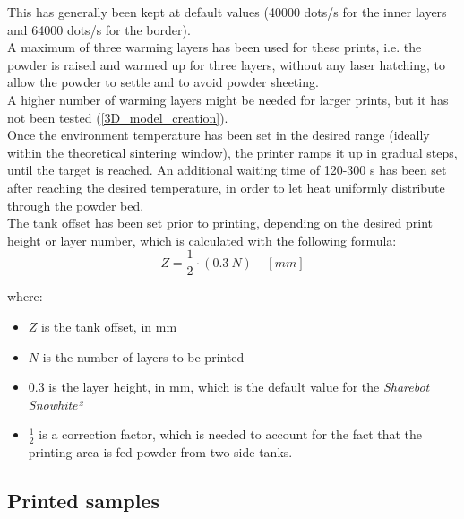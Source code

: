 \documentclass{article}
\begin{document}
        This has generally been kept at default values (40000 dots/s for the inner layers and 64000 dots/s for the border).  \\ 

        A maximum of three warming layers has been used for these prints, i.e. the powder is raised and warmed 
        up for three layers, without any laser hatching, to allow the powder to settle and to avoid 
        powder sheeting. \\ 
        A higher number of warming layers might be needed for larger prints, but it has not been tested 
        (\ref{3D_model_creation}). \\

        Once the environment temperature has been set in the desired range (ideally within the theoretical 
        sintering window), the printer ramps it up in gradual steps, until the target is reached.  
        An additional waiting time of 120-300 s has been set after reaching the desired temperature, in order to let heat 
        uniformly distribute through the powder bed. \\

        The tank offset has been set prior to printing, depending on the desired print height or 
        layer number, which is calculated with the following formula: \\
        
        \begin{equation}
            Z =  \frac{1}{2} \cdot (0.3 \  N) \ \ \ \ \  [mm]
            \label{eq:layer_height}
        \end{equation}
        
        
        where:
        \begin{itemize}
            \item $Z$ is the tank offset, in mm
            \item $N$ is the number of layers to be printed 
            \item $0.3$ is the layer height, in mm, which is the default value for the \textit{Sharebot Snowhite²}
            \item $\frac{1}{2}$ is a correction factor, which is needed to account for the fact that the printing area is fed powder 
            from two side tanks.
        \end{itemize}
        



        \clearpage
        \subsection{Printed samples\label{Printed_samples}}
\end{document}
